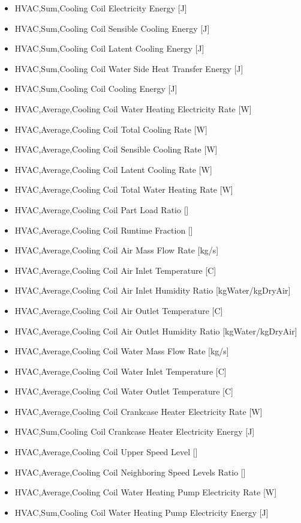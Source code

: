 \begin{itemize}
\item
  HVAC,Sum,Cooling Coil Electricity Energy {[}J{]}
\item
  HVAC,Sum,Cooling Coil Sensible Cooling Energy {[}J{]}
\item
  HVAC,Sum,Cooling Coil Latent Cooling Energy {[}J{]}
\item
  HVAC,Sum,Cooling Coil Water Side Heat Transfer Energy {[}J{]}
\item
  HVAC,Sum,Cooling Coil Cooling Energy {[}J{]}
\item
  HVAC,Average,Cooling Coil Water Heating Electricity Rate {[}W{]}
\item
  HVAC,Average,Cooling Coil Total Cooling Rate {[}W{]}
\item
  HVAC,Average,Cooling Coil Sensible Cooling Rate {[}W{]}
\item
  HVAC,Average,Cooling Coil Latent Cooling Rate {[}W{]}
\item
  HVAC,Average,Cooling Coil Total Water Heating Rate {[}W{]}
\item
  HVAC,Average,Cooling Coil Part Load Ratio {[}{]}
\item
  HVAC,Average,Cooling Coil Runtime Fraction {[}{]}
\item
  HVAC,Average,Cooling Coil Air Mass Flow Rate {[}kg/s{]}
\item
  HVAC,Average,Cooling Coil Air Inlet Temperature {[}C{]}
\item
  HVAC,Average,Cooling Coil Air Inlet Humidity Ratio {[}kgWater/kgDryAir{]}
\item
  HVAC,Average,Cooling Coil Air Outlet Temperature {[}C{]}
\item
  HVAC,Average,Cooling Coil Air Outlet Humidity Ratio {[}kgWater/kgDryAir{]}
\item
  HVAC,Average,Cooling Coil Water Mass Flow Rate {[}kg/s{]}
\item
  HVAC,Average,Cooling Coil Water Inlet Temperature {[}C{]}
\item
  HVAC,Average,Cooling Coil Water Outlet Temperature {[}C{]}
\item
  HVAC,Average,Cooling Coil Crankcase Heater Electricity Rate {[}W{]}
\item
  HVAC,Sum,Cooling Coil Crankcase Heater Electricity Energy {[}J{]}
\item
  HVAC,Average,Cooling Coil Upper Speed Level {[}{]}
\item
  HVAC,Average,Cooling Coil Neighboring Speed Levels Ratio {[}{]}
\item
  HVAC,Average,Cooling Coil Water Heating Pump Electricity Rate {[}W{]}
\item
  HVAC,Sum,Cooling Coil Water Heating Pump Electricity Energy {[}J{]}
\end{itemize}


